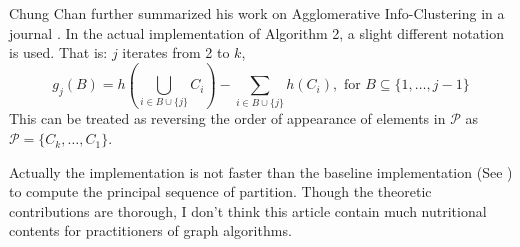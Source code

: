 \documentclass{ctexart}
\begin{document}
    Chung Chan further summarized his work on Agglomerative Info-Clustering
    in a journal \cite{chan2020agglomerative}.
    In the actual implementation of Algorithm 2,
    a slight different notation is used. 
    That is: $j$ iterates from 2 to $k$,
    \begin{equation}
        g_j(B) = h(\bigcup_{i \in B \cup \{j\}} C_i)
        - \sum_{i \in B \cup \{j\} } h(C_i), \textrm{ for } B \subseteq \{1, \dots, j-1\}
    \end{equation}
    This can be treated as reversing the order of appearance of elements
    in $\mathcal{P}$ as 
    $\mathcal{P} = \{C_k, \dots, C_1\}$.

    Actually the implementation is not faster than the baseline implementation (See \cite{mac})
    to compute the
    principal sequence of partition. Though the theoretic
    contributions are thorough, I don't think this article contain
    much nutritional contents for practitioners of graph algorithms.
    
    
\end{document}
